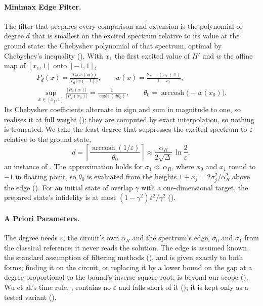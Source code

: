 \paragraph{Minimax Edge Filter.} The filter that prepares every comparison and extension is the polynomial of degree $d$ that is smallest on the excited spectrum relative to its value at the ground state: the Chebyshev polynomial of that spectrum, optimal by Chebyshev's inequality (). With $x_1$ the first excited value of $H'$ and $w$ the affine map of $[x_1,1]$ onto $[-1,1]$,
\begin{equation}
    \begin{gathered}
        P_d(x)=\frac{T_d\bigl(w(x)\bigr)}{T_d\bigl(w(-1)\bigr)},
        \qquad
        w(x)=\frac{2x-(x_1+1)}{1-x_1},
        \\
        \sup_{x\in[x_1,1]}\frac{|P_d(x)|}{|P_d(x_0)|}=\frac{1}{\cosh(d\theta_0)},
        \qquad
        \theta_0=\operatorname{arccosh}\bigl(-w(x_0)\bigr).
    \end{gathered}
    \label{eq:minimax-filter}
\end{equation}
Its Chebyshev coefficients alternate in sign and sum in magnitude to one, so  realises it at full weight (); they are computed by exact interpolation, so nothing is truncated. We take the least degree that suppresses the excited spectrum to $\varepsilon$ relative to the ground state,
\begin{equation}
    d=\left\lceil\frac{\operatorname{arccosh}(1/\varepsilon)}{\theta_0}\right\rceil
    \approx\frac{\alpha_R}{2\sqrt\Delta}\,\ln\frac{2}{\varepsilon},
    \label{eq:minimax-degree}
\end{equation}
an instance of . The approximation holds for $\sigma_1\ll\alpha_R$, where $x_0$ and $x_1$ round to $-1$ in floating point, so $\theta_0$ is evaluated from the heights $1+x_j=2\sigma_j^2/\alpha_R^2$ above the edge (). For an initial state of overlap $\gamma$ with a one-dimensional target, the prepared state's infidelity is at most $(1-\gamma^2)\varepsilon^2/\gamma^2$ ().

\paragraph{A Priori Parameters.} The degree needs $\varepsilon$, the circuit's own $\alpha_R$ and the spectrum's edge, $\sigma_0$ and $\sigma_1$ from the classical reference; it never reads the solution. The edge is assumed known, the standard assumption of filtering methods (), and is given exactly to both forms; finding it on the circuit, or replacing it by a lower bound on the gap at a degree proportional to the bound's inverse square root, is beyond our scope (). Wu et al.'s time rule, , contains no $\varepsilon$ and falls short of it (); it is kept only as a tested variant ().

